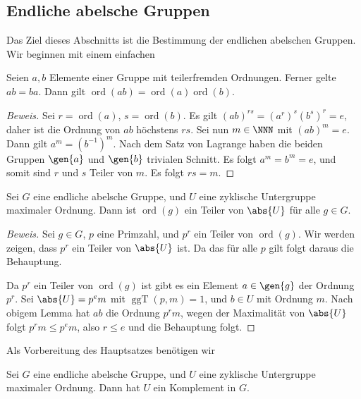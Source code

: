\documentclass[12pt,a4paper,twoside]{article}
\DeclareMathOperator{\ord}{ord}
\DeclareMathOperator{\ggT}{ggT}
\begin{document}
\subsection{Endliche abelsche Gruppen}
Das Ziel dieses Abschnitts ist die Bestimmung der endlichen abelschen Gruppen.
Wir beginnen mit einem einfachen
\begin{Lemma}
  Seien $a,b$ Elemente einer Gruppe mit teilerfremden Ordnungen. Ferner gelte
  $ab=ba$. Dann gilt $\ord(ab)=\ord(a)\ord(b)$.
\end{Lemma}
\begin{proof}[Beweis]
  Sei $r=\ord(a)$, $s=\ord(b)$. Es gilt $(ab)^{rs}=(a^r)^s(b^s)^r=e$, daher
  ist die Ordnung von $ab$ h\"ochstens $rs$. Sei nun $m\in\NNN$ mit
  $(ab)^m=e$. Dann gilt $a^m=(b^{-1})^m$. Nach dem Satz von Lagrange haben die
  beiden Gruppen $\gen{a}$ und $\gen{b}$ trivialen Schnitt. Es folgt
  $a^m=b^m=e$, und somit sind $r$ und $s$ Teiler von $m$. Es folgt $rs=m$.
\end{proof}
\begin{Lemma}
  Sei $G$ eine endliche abelsche Gruppe, und $U$ eine zyklische Untergruppe
  maximaler Ordnung. Dann ist $\ord(g)$ ein Teiler von $\abs{U}$ f\"ur alle
  $g\in G$.
\end{Lemma}
\begin{proof}[Beweis]
  Sei $g\in G$, $p$ eine Primzahl, und $p^r$ ein Teiler von $\ord(g)$. Wir
  werden zeigen, dass $p^r$ ein Teiler von $\abs{U}$ ist. Da das f\"ur alle
  $p$ gilt folgt daraus die Behauptung.
  
  Da $p^r$ ein Teiler von $\ord(g)$ ist gibt es ein Element $a\in\gen{g}$ der
  Ordnung $p^r$. Sei $\abs{U}=p^em$ mit $\ggT(p,m)=1$, und $b\in U$ mit
  Ordnung $m$. Nach obigem Lemma hat $ab$ die Ordnung $p^rm$, wegen der
  Maximalit\"at von $\abs{U}$ folgt $p^rm\le p^em$, also $r\le e$ und die
  Behauptung folgt.
\end{proof}
Als Vorbereitung des Hauptsatzes ben\"otigen wir
\begin{Lemma}
  Sei $G$ eine endliche abelsche Gruppe, und $U$ eine zyklische Untergruppe
  maximaler Ordnung. Dann hat $U$ ein Komplement in $G$.
\end{Lemma}
\end{document}
